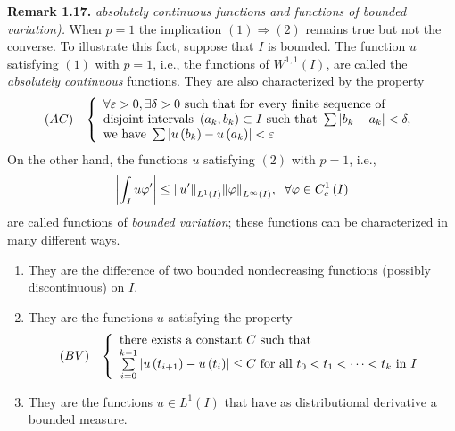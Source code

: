 \documentclass[a4paper,oneside]{book}
\numberwithin{equation}{chapter}
\begin{document}
\textbf{Remark 1.17.} \textit{absolutely continuous functions and functions of bounded variation).} When $p=1$ the implication $\left( 1 \right) \Rightarrow \left( 2 \right)$ remains true but not the converse. To illustrate this fact, suppose that $I$ is bounded. The function $u$ satisfying $\left(1\right)$ with $p=1$, i.e., the functions of $W^{1,1}\left(I\right)$, are called the \textit{absolutely continuous} functions. They are also characterized by the property
\begin{align}
\left(AC\right) \hspace{0.3cm}\left\{ \begin{array}{l}
\forall \varepsilon  > 0,\exists \delta  > 0\mbox{ such that for every finite sequence of}\\
\mbox{disjoint intervals }\left( {{a_k},{b_k}} \right) \subset I\mbox{ such that } \sum {\left| {{b_k} - {a_k}} \right|}  < \delta ,\\
\mbox{we have }\sum {\left| {u\left( {{b_k}} \right) - u\left( {{a_k}} \right)} \right|}  < \varepsilon 
\end{array} \right.
\end{align}
On the other hand, the functions $u$ satisfying $\left(2\right)$ with $p=1$, i.e.,
\begin{align}
\left| {\int_I {u\varphi '} } \right| \le {\left\| {u'} \right\|_{{L^1}\left( I \right)}}{\left\| \varphi  \right\|_{{L^\infty }\left( I \right)}},\hspace{0.2cm}\forall \varphi  \in C_c^1\left( I \right)
\end{align}
are called functions of \textit{bounded variation}; these functions can be characterized in many different ways.
\begin{enumerate}
\item They are the difference of two bounded nondecreasing functions (possibly discontinuous) on $I$.
\item They are the functions $u$ satisfying the property
\begin{align}
\left( {BV} \right)\hspace{0.3cm} \left\{ \begin{array}{l}
\mbox{there exists a constant }C\mbox{ such that}\\
\sum\limits_{i = 0}^{k - 1} {\left| {u\left( {{t_{i + 1}}} \right) - u\left( {{t_i}} \right)} \right|}  \le C\mbox{ for all } {t_0} < {t_1} <  \cdots  < {t_k}\mbox{ in } I
\end{array} \right.
\end{align}
\item They are the functions $u\in L^1\left(I\right)$ that have as distributional derivative a bounded measure.
\end{enumerate}
\end{document}
